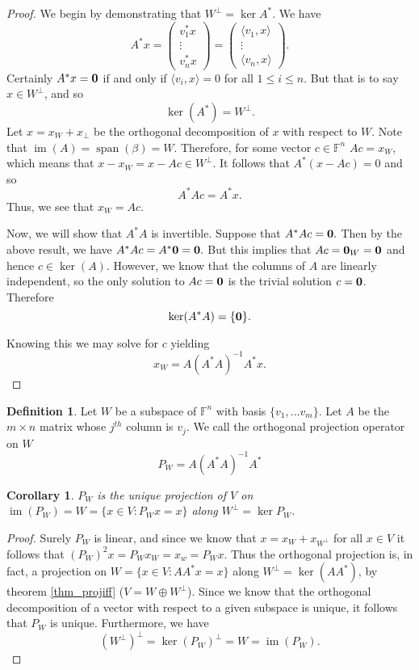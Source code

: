 \documentclass[oneside, 12pt]{book}
\DeclareMathOperator{\spn}{span}
\DeclareMathOperator{\im}{im}
\newtheorem{cor}{Corollary}[section]
\theoremstyle{definition}
\newtheorem{defn}{Definition}[section]
\begin{document}
\begin{proof}
  We begin by demonstrating that $W^{\perp}=\ker A^{*}$. We have
  \[A^{*}x= \begin{pmatrix}v_{1}^{*}x \\ \vdots \\ v_{n}^{*}x \end{pmatrix}=\begin{pmatrix}\langle v_{1}, x \rangle \\  \vdots \\ \langle v_{n}, x \rangle\end{pmatrix}.\] Certainly
  $A^{*}x=\bold{0}$ if and only if $\langle v_{i}, x \rangle=0$ for all $1 \leq i \leq n$. But that is to say $x \in W^{\perp}$, and so \[\ker(A^{*})=W^{\perp}.\]
  Let $x=x_{W}+x_{\perp}$ be the orthogonal decomposition of $x$ with respect to $W$.
  Note that $\im(A)=\spn(\beta)=W$. Therefore, for some vector $c \in \mathbb{F}^{n}$ $Ac=x_{W}$, which means that $x-x_{W}=x-Ac \in W^{\perp}$. It follows that
  $A^{*}(x-Ac)=0$ and so \[A^{*}Ac=A^{*}x.\] Thus, we see that $x_{W}=Ac$.

  Now, we will show that $A^{*}A$ is invertible. Suppose that $A^{*}Ac=\bold{0}.$ Then by the above result, we have $A^{*}Ac=A^{*}\bold{0}=\bold{0}.$ But this implies that $Ac=\bold{0}_{W}=\bold{0}$ and hence $c \in \ker(A)$. However, we know that the columns of $A$ are linearly independent, so the only solution to $Ac=\bold{0}$ is the trivial solution $c=\bold{0}$. Therefore \[\ker(A^{*}A)=\{\bold{0}\}.\]

  Knowing this we may solve for $c$ yielding \[x_{W}=A(A^{*}A)^{-1}A^{*}x.\]
\end{proof}
\begin{defn}
  \label{ortho_proj}
  Let $W$ be a subspace of $\mathbb{F}^{n}$ with basis $\{v_{1}, \dots v_{m}\}$. Let $A$ be the $m \times n$ matrix whose $j^{th}$ column is $v_{j}$. We call the orthogonal projection operator on $W$
  \[P_{W}=A(A^{*}A)^{-1}A^{*}\]
\end{defn}
\begin{cor}
  \label{cor_orthproj}
$P_{W}$ is the unique projection of $V$ on $\im(P_{W})=W=\{x \in V: P_{W}x=x\}$ along $W^{\perp}=\ker{P_{W}}$.
\end{cor}
\begin{proof}
  Surely $P_{W}$ is linear, and since we know that $x=x_{W}+x_{W^{\perp}}$ for all $x \in V$ it follows that $(P_{W})^{2}x=P_{W}x_{W}=x_{w}=P_{W}x$. Thus the orthogonal projection is, in fact, a projection on $W=\{x \in V: AA^{*}x=x \}$ along $W^{\perp}=\ker(AA^{*})$, by theorem \ref{thm_projiff} ($V=W \oplus W^{\perp}$). Since we know that the orthogonal decomposition of a vector with respect to a given subspace is unique, it follows that $P_{W}$ is unique.
  Furthermore, we have \[(W^{\perp})^{\perp}=\ker(P_{W})^{\perp}=W=\im(P_{W}).\]
\end{proof}
\end{document}
